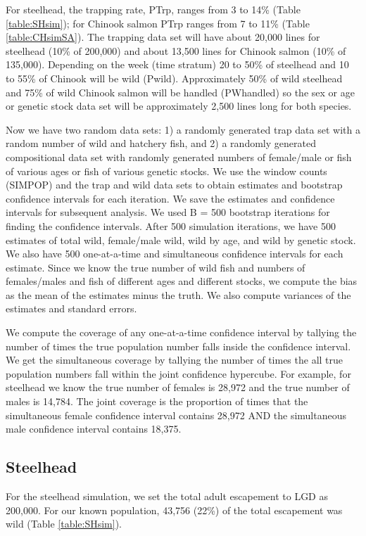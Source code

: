 \documentclass[11pt]{article}
\begin{document}
For steelhead, the trapping rate, PTrp, ranges from 3 to 14\% (Table \ref{table:SHsim}); for Chinook salmon PTrp ranges from 7 to 11\% (Table \ref{table:CHsimSA}). The trapping data set will have about 20,000 lines for steelhead (10\% of 200,000) and about 13,500 lines for Chinook salmon (10\% of 135,000). Depending on the week (time stratum) 20 to 50\% of steelhead and 10 to 55\% of Chinook will be wild (Pwild). Approximately 50\% of wild steelhead and 75\% of wild Chinook salmon will be handled (PWhandled) so the sex or age or genetic stock data set will be approximately 2,500 lines long for both species.

Now we have two random data sets: 1) a randomly generated trap data set with a random number of wild and hatchery fish, and 2) a randomly generated compositional data set with randomly generated numbers of female/male or fish of various ages or fish of various genetic stocks. We use the window counts (SIMPOP) and the trap and wild data sets to obtain estimates and bootstrap confidence intervals for each iteration. We save the estimates and confidence intervals for subsequent analysis. We used B = 500 bootstrap iterations for finding the confidence intervals. After 500 simulation iterations, we have 500 estimates of total wild, female/male wild, wild by age, and wild by genetic stock. We also have 500 one-at-a-time and simultaneous confidence intervals for each estimate. Since we know the true number of wild fish and numbers of females/males and fish of different ages and different stocks, we compute the bias as the mean of the estimates minus the truth. We also compute variances of the estimates and standard errors.

We compute the coverage of any one-at-a-time confidence interval by tallying the number of times the true population number falls inside the confidence interval. We get the simultaneous coverage by tallying the number of times the all true population numbers fall within the joint confidence hypercube. For example, for steelhead we know the true number of females is 28,972 and the true number of males is 14,784. The joint coverage is the proportion of times that the simultaneous female confidence interval contains 28,972 AND the simultaneous male confidence interval contains 18,375.

\subsection{Steelhead}

For the steelhead simulation, we set the total adult escapement to LGD as 200,000. For our known population, 43,756 (22\%) of the total escapement was wild (Table \ref{table:SHsim}).
\end{document}
